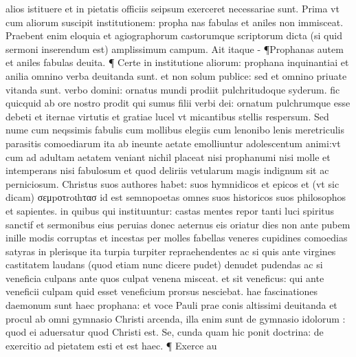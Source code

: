 \documentclass{article}
\begin{document}
\begin{pages}
alios istituere et in pietatis officiis seipsum exerceret necessariae sunt. Prima vt cum aliorum suscipit institutionem: propha nas fabulas et aniles non immisceat. Praebent enim eloquia et agiographorum castorumque scriptorum dicta (si quid sermoni inserendum est) amplissimum campum. Ait itaque - ¶Prophanas autem et aniles fabulas deuita. ¶ Certe in institutione aliorum: prophana inquinantiai et anilia omnino verba deuitanda sunt. et non solum publice: sed et omnino priuate vitanda sunt. verbo domini: ornatus mundi prodiit pulchritudoque syderum. fic quicquid ab ore nostro prodit qui sumus filii verbi dei: ornatum pulchrumque  esse debeti et iternae virtutis et gratiae lucel vt micantibus stellis respersum. Sed nume cum neqssimis fabulis cum mollibus elegiis cum lenonibo lenis meretriculis parasitis comoediarum ita ab ineunte aetate emolliuntur adolescentum animi:vt cum ad adultam aetatem veniant  nichil placeat nisi prophanumi nisi molle et intemperans nisi fabulosum et quod deliriis vetularum magis indignum sit ac perniciosum. Christus suos authores habet: suos hymnidicos et epicos et (vt sic dicam) σεμpοτroιhτασ id est semnopoetas omnes suos historicos suos philosophos et sapientes. in quibus qui instituuntur: castas mentes repor tanti luci spiritus sanctif et sermonibus eius peruias donec aeternus eis oriatur dies non ante pubem inille modis corruptas et incestas per molles fabellas veneres cupidines  comoedias satyras in plerisque ita turpia turpiter repraehendentes ac si quis ante virgines castitatem laudans (quod etiam nunc dicere pudet) denudet pudendas ac si veneficia culpans ante quos culpat venena misceat. et sit veneficus: qui ante veneficii culpam quid esset veneficium prorsus nesciebat. hae fascinationes daemonum sunt haec prophana: et voce Pauli prae conis altissimi deuitanda et procul ab omni gymnasio Christi arcenda, illa enim sunt de gymnasio idolorum : quod ei aduersatur quod Christi est. Se, cunda quam hic ponit doctrina: de exercitio ad pietatem esti et est haec. ¶ Exerce au\pend

\end{pages}
\end{document}
